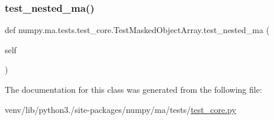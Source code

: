 \mbox{\label{classnumpy_1_1ma_1_1tests_1_1test__core_1_1TestMaskedObjectArray_a28b83450bd9d9bbffb2f8f751b33bed1}} 
\subsubsection{\texorpdfstring{test\+\_\+nested\+\_\+ma()}{test\_nested\_ma()}}
{\footnotesize\ttfamily def numpy.\+ma.\+tests.\+test\+\_\+core.\+Test\+Masked\+Object\+Array.\+test\+\_\+nested\+\_\+ma (\begin{DoxyParamCaption}\item[{}]{self }\end{DoxyParamCaption})}



The documentation for this class was generated from the following file\+:\begin{DoxyCompactItemize}
\item 
venv/lib/python3./site-\/packages/numpy/ma/tests/\hyperlink{numpy_2ma_2tests_2test__core_8py}{test\+\_\+core.\+py}\end{DoxyCompactItemize}
